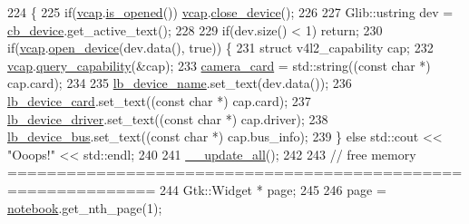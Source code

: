 \begin{DoxyCode}
224                                                  \{
225         \textcolor{keywordflow}{if}(\hyperlink{class_v_s_s_s___g_u_i_1_1_v4_l_interface_a7ece61f4ccc6d5321c445e60f34e7f33}{vcap}.\hyperlink{classv4lcap_a0feac915e89a04f087bce5310f8b1051}{is\_opened}()) \hyperlink{class_v_s_s_s___g_u_i_1_1_v4_l_interface_a7ece61f4ccc6d5321c445e60f34e7f33}{vcap}.\hyperlink{classv4lcap_adbb658a6f3248f24ee7926722e76ca43}{close\_device}();
226 
227         Glib::ustring dev = \hyperlink{class_v_s_s_s___g_u_i_1_1_v4_l_interface_a9aebd92fe12b9b5acc25b1113dbd022e}{cb\_device}.get\_active\_text();
228 
229         \textcolor{keywordflow}{if}(dev.size() < 1) \textcolor{keywordflow}{return};
230         \textcolor{keywordflow}{if}(\hyperlink{class_v_s_s_s___g_u_i_1_1_v4_l_interface_a7ece61f4ccc6d5321c445e60f34e7f33}{vcap}.\hyperlink{classv4lcap_a1404aae893a64a8e8859d822a4dfb273}{open\_device}(dev.data(), \textcolor{keyword}{true})) \{
231             \textcolor{keyword}{struct }v4l2\_capability cap;
232             \hyperlink{class_v_s_s_s___g_u_i_1_1_v4_l_interface_a7ece61f4ccc6d5321c445e60f34e7f33}{vcap}.\hyperlink{classv4lcap_aff4ca1e9742c8659582810529b8c9a2c}{query\_capability}(&cap);
233             \hyperlink{class_v_s_s_s___g_u_i_1_1_v4_l_interface_a7842aff21c2c295a77e75567ff50f25c}{camera\_card} = std::string((\textcolor{keyword}{const} \textcolor{keywordtype}{char} *) cap.card);
234 
235             \hyperlink{class_v_s_s_s___g_u_i_1_1_v4_l_interface_a0001884d9b8cfde31da71445c1604c8a}{lb\_device\_name}.set\_text(dev.data());
236             \hyperlink{class_v_s_s_s___g_u_i_1_1_v4_l_interface_add0fb393e547f0ccaa23d6b29025efe4}{lb\_device\_card}.set\_text((\textcolor{keyword}{const} \textcolor{keywordtype}{char} *) cap.card);
237             \hyperlink{class_v_s_s_s___g_u_i_1_1_v4_l_interface_a7fe7bf3327c1f25e1c3b44f53e5c5a8f}{lb\_device\_driver}.set\_text((\textcolor{keyword}{const} \textcolor{keywordtype}{char} *) cap.driver);
238             \hyperlink{class_v_s_s_s___g_u_i_1_1_v4_l_interface_a14d315a5613f2a10e2534c9090ca74c0}{lb\_device\_bus}.set\_text((\textcolor{keyword}{const} \textcolor{keywordtype}{char} *) cap.bus\_info);
239         \} \textcolor{keywordflow}{else} std::cout << \textcolor{stringliteral}{"Ooops!"} << std::endl;
240 
241         \hyperlink{class_v_s_s_s___g_u_i_1_1_v4_l_interface_ac3fe0a20fd30c6e9505eb375ef63e52e}{\_\_update\_all}();
242 
243         \textcolor{comment}{// free memory =============================================================}
244         Gtk::Widget * page;
245 
246         page = \hyperlink{class_v_s_s_s___g_u_i_1_1_v4_l_interface_a658017c295c18a779272aa6182664da5}{notebook}.get\_nth\_page(1);

\end{DoxyCode}

